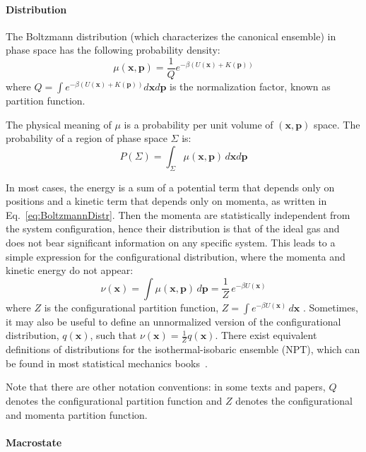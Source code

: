 \documentclass[9pt,review]{livecoms}
\newcommand{\vx}{\mathbf{x}}
\newcommand{\vp}{\mathbf{p}}
\begin{document}
\hypertarget{ref:Distribution}{\paragraph{Distribution}}

The Boltzmann distribution (which characterizes the canonical ensemble) in phase space has the following probability density:
\begin{equation}
\mu(\vx, \vp) = \frac{1}{Q} e^{-\beta (U(\vx) + K(\vp))}
\label{eq:BoltzmannDistr}
\end{equation}
where $ \displaystyle Q = \int e^{-\beta (U(\vx) + K(\vp))} d\vx d\vp$ is the normalization factor, known as partition function.

The physical meaning of $\mu$ is a probability per unit volume of $(\vx, \vp)$ space. The probability of a region of phase space $\Sigma$ is:
\begin{equation}
    P(\Sigma) = \int_\Sigma \mu(\vx, \vp) \, d\vx d\vp
\end{equation}

In most cases, the energy is a sum of a potential term that depends only on positions and a kinetic term that depends only on momenta, as written in Eq.~\ref{eq:BoltzmannDistr}.
Then the momenta are statistically independent from the system configuration, hence their distribution is that of the ideal gas and does not bear significant information on any specific system.
This leads to a simple expression for the configurational distribution, where the momenta and kinetic energy do not appear:
\begin{equation}
\nu(\vx) = \int \mu(\vx, \vp) \, d\vp = \frac{1}{Z} \, e^{-\beta U(\vx)}
\end{equation}
where $Z$ is the configurational partition function, $ Z = \int e^{-\beta U(\vx)} \, d\vx$ . Sometimes, it may also be useful to define an unnormalized version of the configurational distribution, $q(\vx)$, such that $\nu(\vx) = \frac{1}{Z}q(\vx)$. There exist equivalent definitions of distributions for the isothermal-isobaric ensemble (NPT), which can be found in most statistical mechanics books~\cite{Zuckerman2010, Tuckerman2010}.

Note that there are other notation conventions: in some texts and papers, $Q$ denotes the configurational partition function and $Z$ denotes the configurational and momenta partition function.


\hypertarget{ref:Macrostate} {\paragraph{Macrostate}}
\end{document}
